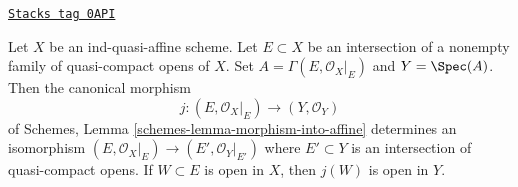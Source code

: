 \begin{lemma}
\label{more-groupoids-lemma-sits-in-functions}
\href{https://stacks.math.columbia.edu/tag/0API}{\texttt{Stacks tag 0API}}

Let $X$ be an ind-quasi-affine scheme. Let $E \subset X$ be an
intersection of a nonempty family of quasi-compact opens of $X$.
Set $A = \Gamma(E, \mathcal{O}_X|_E)$ and $Y = \Spec(A)$.
Then the canonical morphism
$$
j : (E, \mathcal{O}_X|_E) \longrightarrow (Y, \mathcal{O}_Y)
$$
of Schemes, Lemma \ref{schemes-lemma-morphism-into-affine}
determines an isomorphism
$(E, \mathcal{O}_X|_E) \to (E', \mathcal{O}_Y|_{E'})$
where $E' \subset Y$ is an intersection of quasi-compact opens.
If $W \subset E$ is open in $X$, then $j(W)$ is open in $Y$.
\end{lemma}

